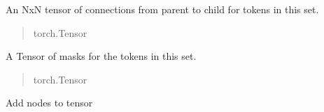 \documentclass[letterpaper,10pt,english]{sphinxmanual}
\begin{document}
\begin{fulllineitems}
\begin{fulllineitems}
\begin{quote}
\begin{description}
\end{description}\end{quote}

\end{fulllineitems}


\begin{fulllineitems}
\label{\detokenize{nodes:nodes.nodeTensors.Tokens.connections}}
\pysigstartsignatures
\pysigline
{}
\pysigstopsignatures
\sphinxAtStartPar
An NxN tensor of connections from parent to child for tokens in this set.
\begin{quote}\begin{description}
\sphinxAtStartPar
torch.Tensor

\end{description}\end{quote}

\end{fulllineitems}


\begin{fulllineitems}
\label{\detokenize{nodes:nodes.nodeTensors.Tokens.masks}}
\pysigstartsignatures
\pysigline
{}
\pysigstopsignatures
\sphinxAtStartPar
A Tensor of masks for the tokens in this set.
\begin{quote}\begin{description}
\sphinxAtStartPar
torch.Tensor

\end{description}\end{quote}

\end{fulllineitems}


\begin{fulllineitems}
\label{\detokenize{nodes:nodes.nodeTensors.Tokens.add_nodes}}
\pysigstartsignatures
\pysiglinewithargsret
{}
{}
{}
\pysigstopsignatures
\sphinxAtStartPar
Add nodes to tensor


\end{fulllineitems}
\end{fulllineitems}
\end{document}
